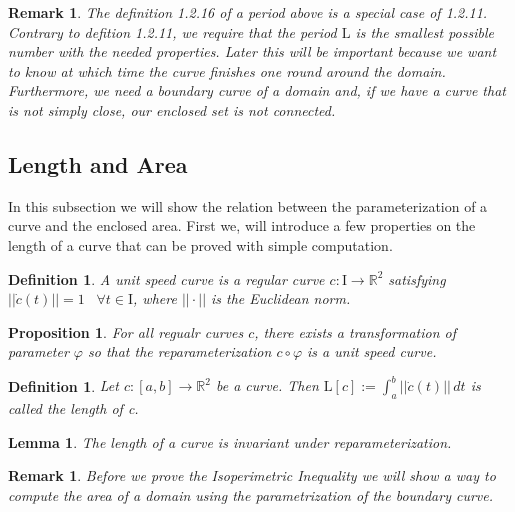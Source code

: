 \documentclass[a4paper]{book}
\newtheorem{lemma}[theorem]{Lemma}%
\newtheorem{remark}[theorem]{Remark}%
\newtheorem{proposition}[theorem]{Proposition}%
\newtheorem{definition}[theorem]{Definition}%
\numberwithin{theorem}{section}%
\begin{document}
\begin{remark}
    The definition 1.2.16 of a period above is a special case of 1.2.11. Contrary to defition 1.2.11, we require that the period $\mathrm{L}$ is the smallest possible number with the needed properties. Later this will be important because we want to know at which time the curve finishes one round around the domain. Furthermore, we need a boundary curve of a domain and, if we have a curve that is not simply close, our enclosed set is not connected.
\end{remark}

\subsection{Length and Area}
In this subsection we will show the relation between the parameterization of a curve and the enclosed area. First we, will introduce a few properties on the length of a curve that can be proved with simple computation.

\begin{definition}
    A unit speed curve is a regular curve $c:\mathrm{I}\to\mathbb{R}^2$ satisfying $||\dot{c}(t)||=1\;\;\;\forall t\in\mathrm{I}$, where $||\cdot||$ is the Euclidean norm.
\end{definition}

\begin{proposition}
    For all regualr curves $c$, there exists a transformation of parameter $\varphi$ so that the reparameterization $c\circ\varphi$ is a unit speed curve.
\end{proposition}

\begin{definition}
    Let $c:[a,b]\to\mathbb{R}^2$ be a curve. Then $\mathrm{L}[c]:=\int_{a}^{b}||\dot{c}(t)||\,dt$ is called the length of c.
\end{definition}

\begin{lemma}
    The length of a curve is invariant under reparameterization.
\end{lemma}

\begin{remark}
    Before we prove the Isoperimetric Inequality we will show a way to compute the area of a domain using the parametrization of the boundary curve.
\end{remark}
\end{document}

